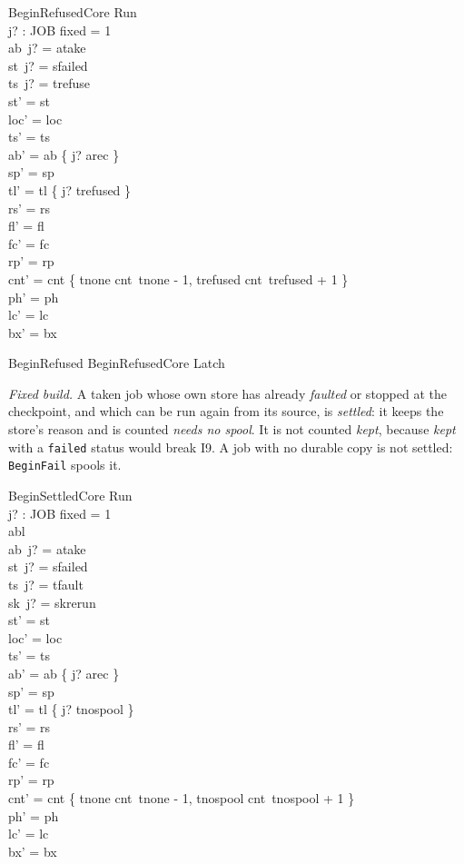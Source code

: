 \documentclass[a4paper,10pt,fleqn]{article}
\newcommand{\field}[1]{\texttt{#1}}
\begin{document}
\begin{schema}{BeginRefusedCore}
\Delta Run \\ j? : JOB
\where
fixed = 1 \\
ab~j? = atake \\
st~j? = sfailed \\
ts~j? = trefuse \\
st' = st \\
loc' = loc \\
ts' = ts \\
ab' = ab \oplus \{ j? \mapsto arec \} \\
sp' = sp \\
tl' = tl \oplus \{ j? \mapsto trefused \} \\
rs' = rs \\
fl' = fl \\
fc' = fc \\
rp' = rp \\
cnt' = cnt \oplus \{ tnone \mapsto cnt~tnone - 1, trefused \mapsto cnt~trefused + 1 \} \\
ph' = ph \\
lc' = lc \\
bx' = bx
\end{schema}

\begin{zed}
BeginRefused  BeginRefusedCore \land Latch
\end{zed}

\emph{Fixed build.} A taken job whose own store has already \emph{faulted} or
stopped at the checkpoint, and which can be run again from its source, is
\emph{settled}: it keeps the store's reason and is counted \emph{needs no spool}.
It is not counted \emph{kept}, because \emph{kept} with a \field{failed} status would
break I9. A job with no durable copy is not settled: \field{BeginFail} spools it.

\begin{schema}{BeginSettledCore}
\Delta Run \\ j? : JOB
\where
fixed = 1 \\
abl  \\
ab~j? = atake \\
st~j? = sfailed \\
ts~j? = tfault \\
sk~j? = skrerun \\
st' = st \\
loc' = loc \\
ts' = ts \\
ab' = ab \oplus \{ j? \mapsto arec \} \\
sp' = sp \\
tl' = tl \oplus \{ j? \mapsto tnospool \} \\
rs' = rs \\
fl' = fl \\
fc' = fc \\
rp' = rp \\
cnt' = cnt \oplus \{ tnone \mapsto cnt~tnone - 1, tnospool \mapsto cnt~tnospool + 1 \} \\
ph' = ph \\
lc' = lc \\
bx' = bx
\end{schema}
\end{document}
